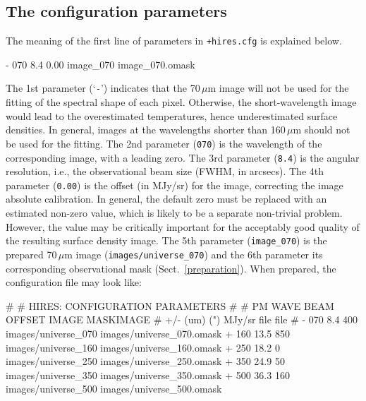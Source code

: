 \documentclass[a4paper,10pt]{article}
\begin{document}

\subsection{The configuration parameters}
\label{edithiconf}

The meaning of the first line of parameters in \verb!+hires.cfg! is explained below.
\begin{verbnobox}[\mbox{}\small]
   -   070   8.4   0.00   image_070  image_070.omask
\end{verbnobox}
The 1st parameter (`\verb!-!') indicates that the 70\,${\mu}$m image will not be used for the fitting of the spectral shape of each
pixel. Otherwise, the short-wavelength image would lead to the overestimated temperatures, hence underestimated surface densities.
In general, images at the wavelengths shorter than 160\,${\mu}$m should not be used for the fitting. The 2nd parameter (\verb!070!)
is the wavelength of the corresponding image, with a leading zero. The 3rd parameter (\verb!8.4!) is the angular resolution, i.e.,
the observational beam size (FWHM, in arcsecs). The 4th parameter (\verb!0.00!) is the offset (in MJy/sr) for the image, correcting
the image absolute calibration. In general, the default zero must be replaced with an estimated non-zero value, which is likely to
be a separate non-trivial problem. However, the value may be critically important for the acceptably good quality of the resulting
surface density image. The 5th parameter (\verb!image_070!) is the prepared 70\,${\mu}$m image (\verb!images/universe_070!) and the
6th parameter its corresponding observational mask (Sect.~\ref{preparation}). When prepared, the configuration file may look like:
\begin{verbnobox}[\mbox{}\small]
#
# HIRES: CONFIGURATION PARAMETERS
#
# PM  WAVE  BEAM  OFFSET  IMAGE               MASKIMAGE
# +/- (um)   (")  MJy/sr  file                file
#
   -   070   8.4   400   images/universe_070  images/universe_070.omask
   +   160  13.5   850   images/universe_160  images/universe_160.omask
   +   250  18.2     0   images/universe_250  images/universe_250.omask
   +   350  24.9    50   images/universe_350  images/universe_350.omask
   +   500  36.3   160   images/universe_500  images/universe_500.omask
\end{verbnobox}
\end{document}
